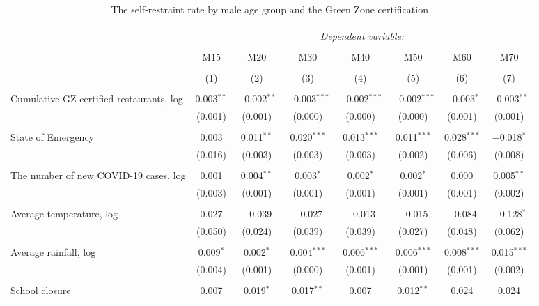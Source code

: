 
\begin{table}[!htbp] \centering 
  \caption{The self-restraint rate by male age group and the Green Zone certification} 
  \label{} 
\footnotesize 
\begin{tabular}{@{\extracolsep{-11pt}}lccccccc} 
\\[-1.8ex]\hline 
\hline \\[-1.8ex] 
 & \multicolumn{7}{c}{\textit{Dependent variable:}} \\ 
\cline{2-8} 
\\[-1.8ex] & M15 & M20 & M30 & M40 & M50 & M60 & M70 \\ 
\\[-1.8ex] & (1) & (2) & (3) & (4) & (5) & (6) & (7)\\ 
\hline \\[-1.8ex] 
 Cumulative GZ-certified restaurants, log & 0.003$^{**}$ & $-$0.002$^{**}$ & $-$0.003$^{***}$ & $-$0.002$^{***}$ & $-$0.002$^{***}$ & $-$0.003$^{*}$ & $-$0.003$^{**}$ \\ 
  & (0.001) & (0.001) & (0.000) & (0.000) & (0.000) & (0.001) & (0.001) \\ 
  & & & & & & & \\ 
 State of Emergency & 0.003 & 0.011$^{**}$ & 0.020$^{***}$ & 0.013$^{***}$ & 0.011$^{***}$ & 0.028$^{***}$ & $-$0.018$^{*}$ \\ 
  & (0.016) & (0.003) & (0.003) & (0.003) & (0.002) & (0.006) & (0.008) \\ 
  & & & & & & & \\ 
 The number of new COVID-19 cases, log & 0.001 & 0.004$^{**}$ & 0.003$^{*}$ & 0.002$^{*}$ & 0.002$^{*}$ & 0.000 & 0.005$^{**}$ \\ 
  & (0.003) & (0.001) & (0.001) & (0.001) & (0.001) & (0.001) & (0.002) \\ 
  & & & & & & & \\ 
 Average temperature, log & 0.027 & $-$0.039 & $-$0.027 & $-$0.013 & $-$0.015 & $-$0.084 & $-$0.128$^{*}$ \\ 
  & (0.050) & (0.024) & (0.039) & (0.039) & (0.027) & (0.048) & (0.062) \\ 
  & & & & & & & \\ 
 Average rainfall, log & 0.009$^{*}$ & 0.002$^{*}$ & 0.004$^{***}$ & 0.006$^{***}$ & 0.006$^{***}$ & 0.008$^{***}$ & 0.015$^{***}$ \\ 
  & (0.004) & (0.001) & (0.000) & (0.001) & (0.001) & (0.001) & (0.002) \\ 
  & & & & & & & \\ 
 School closure & 0.007 & 0.019$^{*}$ & 0.017$^{**}$ & 0.007 & 0.012$^{**}$ & 0.024 & 0.024 \\ 

\end{tabular}
\end{table}
